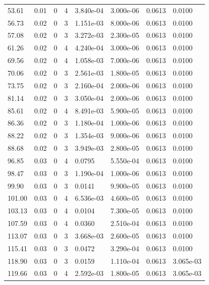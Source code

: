 \documentclass[preview]{standalone}
\begin{document}
{{\begin{tabular}{L{1.2cm}C{1.2cm} C{0.3cm}C{0.5cm} C{1.4cm}C{1.4cm} C{1.4cm}C{1.4cm}}
  53.61  &  0.01  & 0     &  4 &  3.840e-04  & 3.000e-06  & 0.0613 &  0.0100   \\ 
  56.73  &  0.02  & 0     &  3 &  1.151e-03  & 8.000e-06  & 0.0613 &  0.0100   \\ 
  57.08  &  0.02  & 0     &  3 &  3.272e-03  & 2.300e-05  & 0.0613 &  0.0100   \\ 
  61.26  &  0.02  & 0     &  4 &  4.240e-04  & 3.000e-06  & 0.0613 &  0.0100   \\ 
  69.56  &  0.02  & 0     &  4 &  1.058e-03  & 7.000e-06  & 0.0613 &  0.0100   \\ 
  70.06  &  0.02  & 0     &  3 &  2.561e-03  & 1.800e-05  & 0.0613 &  0.0100   \\ 
  73.75  &  0.02  & 0     &  3 &  2.160e-04  & 2.000e-06  & 0.0613 &  0.0100   \\ 
  81.14  &  0.02  & 0     &  3 &  3.050e-04  & 2.000e-06  & 0.0613 &  0.0100   \\ 
  85.61  &  0.02  & 0     &  4 &  8.491e-03  & 5.900e-05  & 0.0613 &  0.0100   \\ 
  86.36  &  0.02  & 0     &  3 &  1.180e-04  & 1.000e-06  & 0.0613 &  0.0100   \\ 
  88.22  &  0.02  & 0     &  3 &  1.354e-03  & 9.000e-06  & 0.0613 &  0.0100   \\ 
  88.68  &  0.02  & 0     &  3 &  3.949e-03  & 2.800e-05  & 0.0613 &  0.0100   \\ 
  96.85  &  0.03  & 0     &  4 &  0.0795  & 5.550e-04  & 0.0613 &  0.0100   \\ 
  98.47  &  0.03  & 0     &  3 &  1.190e-04  & 1.000e-06  & 0.0613 &  0.0100   \\ 
  99.90  &  0.03  & 0     &  3 &  0.0141  & 9.900e-05  & 0.0613 &  0.0100   \\ 
  101.00  &  0.03  & 0     &  4 &  6.536e-03  & 4.600e-05  & 0.0613 &  0.0100   \\ 
  103.13  &  0.03  & 0     &  4 &  0.0104  & 7.300e-05  & 0.0613 &  0.0100   \\ 
  107.59  &  0.03  & 0     &  4 &  0.0360  & 2.510e-04  & 0.0613 &  0.0100   \\ 
  113.07  &  0.03  & 0     &  3 &  3.668e-03  & 2.600e-05  & 0.0613 &  0.0100   \\ 
  115.41  &  0.03  & 0     &  3 &  0.0472  & 3.290e-04  & 0.0613 &  0.0100   \\ 
  118.90  &  0.03  & 0     &  3 &  0.0159  & 1.110e-04  & 0.0613 &  3.065e-03   \\ 
  119.66  &  0.03  & 0     &  4 &  2.592e-03  & 1.800e-05  & 0.0613 &  3.065e-03   \\ 

\end{tabular}}}
\end{document}
